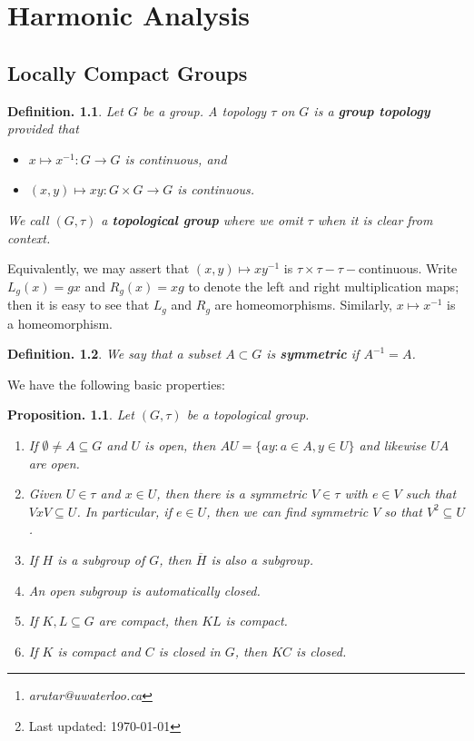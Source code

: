 \documentclass[11pt, a4paper]{memoir}
\title{\subject}
\author{Alex Rutar\thanks{\itshape arutar@uwaterloo.ca}\\ University of Waterloo}
\date{\semester\thanks{Last updated: \today}}
\theoremstyle{change}
\newtheorem{proposition}[theorem]{Proposition.}
\theoremstyle{plain}
\theoremstyle{nonumberplain}
\newtheorem{definition}{Definition.}
\newcommand{\defn}[1]{{\boldmath\bfseries #1}}
\numberwithin{equation}{section}
\begin{document}
\hypersetup{pageanchor=false}
\maketitle
\newpage
\frontmatter
\hypersetup{pageanchor=true}
\tableofcontents*
\newpage
\mainmatter


\chapter{Harmonic Analysis}
\section{Locally Compact Groups}
\begin{definition}
    Let $G$ be a group.
    A topology $\tau$ on $G$ is a \defn{group topology} provided that
    \begin{itemize}[nl]
        \item $x\mapsto x^{-1}:G\to G$ is continuous, and
        \item $(x,y)\mapsto xy:G\times G\to G$ is continuous.
    \end{itemize}
    We call $(G,\tau)$ a \defn{topological group} where we omit $\tau$ when it is clear from context.
\end{definition}
Equivalently, we may assert that $(x,y)\mapsto xy^{-1}$ is $\tau\times\tau-\tau-$continuous.
Write $L_g(x)=gx$ and $R_g(x)=xg$ to denote the left and right multiplication maps; then it is easy to see that $L_g$ and $R_g$ are homeomorphisms.
Similarly, $x\mapsto x^{-1}$ is a homeomorphism.
\begin{definition}
    We say that a subset $A\subset G$ is \defn{symmetric} if $A^{-1}=A$.
\end{definition}
We have the following basic properties:
\begin{proposition}\label{p:tgrp}
    Let $(G,\tau)$ be a topological group.
    \begin{enumerate}[nl,r]
        \item If $\emptyset\neq A\subseteq G$ and $U$ is open, then $AU=\{ay:a\in A,y\in U\}$ and likewise $UA$ are open.
        \item Given $U\in\tau$ and $x\in U$, then there is a symmetric $V\in\tau$ with $e\in V$ such that $VxV\subseteq U$.
            In particular, if $e\in U$, then we can find symmetric $V$ so that $V^2\subseteq U$.
        \item If $H$ is a subgroup of $G$, then $\overline{H}$ is also a subgroup.
        \item An open subgroup is automatically closed.
        \item If $K,L\subseteq G$ are compact, then $KL$ is compact.
        \item If $K$ is compact and $C$ is closed in $G$, then $KC$ is closed.
    \end{enumerate}
\end{proposition}
\end{document}
